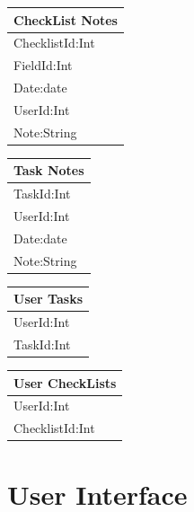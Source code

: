 \documentclass{article}
\begin{document}
\begin{tabular}{|l|} \hline
    \textbf{CheckList Notes} \\ \hline
    ChecklistId:Int\\
    FieldId:Int\\
    Date:date\\
    UserId:Int\\
    Note:String\\ \hline
\end{tabular}
\hfill
\begin{tabular}{|l|} \hline
    \textbf{Task Notes} \\ \hline
    TaskId:Int\\
    UserId:Int\\
    Date:date\\
    Note:String\\ \hline
\end{tabular}

\begin{tabular}{|l|} \hline
    \textbf{User Tasks} \\ \hline
    UserId:Int\\
    TaskId:Int\\ \hline
\end{tabular}
\hfill
\begin{tabular}{|l|} \hline
    \textbf{User CheckLists} \\ \hline
    UserId:Int\\
    ChecklistId:Int\\ \hline
\end{tabular}

\newpage
\section{User Interface}
\end{document}
